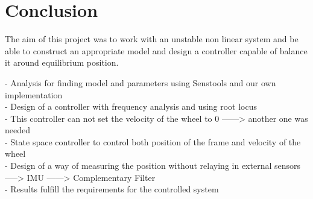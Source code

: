 \chapter{Conclusion}

The aim of this project was to work with an unstable non linear system and be able to construct an appropriate model and design a controller capable of balance it around equilibrium position.

- Analysis for finding model and parameters using Senstools and our own implementation\\
- Design of a controller with frequency analysis and using root locus\\
- This controller can not set the velocity of the wheel to 0 ------> another one was needed\\
- State space controller to control both position of the frame and velocity of the wheel\\
- Design of a way of measuring the position without relaying in external sensors -----> IMU ------> Complementary Filter\\
- Results fulfill the requirements for the controlled system